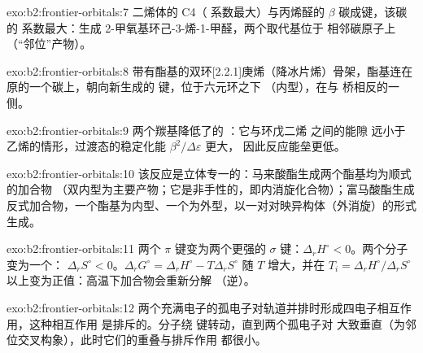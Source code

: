 \begin{solution}{exo:b2:frontier-orbitals:7}
二烯体的 C4（ 系数最大）与丙烯醛的 $\beta$ 碳成键，该碳的
 系数最大：生成 2-甲氧基环己-3-烯-1-甲醛，两个取代基位于
相邻碳原子上（“邻位”产物）。
\end{solution}

\begin{solution}{exo:b2:frontier-orbitals:8}
带有酯基的双环[2.2.1]庚烯（降冰片烯）骨架，酯基连在
原的一个碳上，朝向新生成的  键，位于六元环之下
（内型），在与  桥相反的一侧。
\end{solution}

\begin{solution}{exo:b2:frontier-orbitals:9}
两个羰基降低了的 ：它与环戊二烯  之间的能隙
远小于乙烯的情形，过渡态的稳定化能 $\beta^2/\Delta\varepsilon$ 更大，
因此反应能垒更低。
\end{solution}

\begin{solution}{exo:b2:frontier-orbitals:10}
该反应是立体专一的：马来酸酯生成两个酯基均为顺式的加合物
（双内型为主要产物；它是非手性的，即内消旋化合物）；富马酸酯生成
反式加合物，一个酯基为内型、一个为外型，以一对对映异构体（外消旋）的形式生成。
\end{solution}

\begin{solution}{exo:b2:frontier-orbitals:11}
两个 $\pi$ 键变为两个更强的 $\sigma$ 键：$\Delta_r H^\circ < 0$。两个分子变为一个：
$\Delta_r S^\circ < 0$。$\Delta_r G^\circ = \Delta_r H^\circ - T\Delta_r S^\circ$ 随 $T$ 增大，并在
$T_i = \Delta_r H^\circ/\Delta_r S^\circ$ 以上变为正值：高温下加合物会重新分解
（逆）。
\end{solution}

\begin{solution}{exo:b2:frontier-orbitals:12}
两个充满电子的孤电子对轨道并排时形成四电子相互作用，这种相互作用
是排斥的。分子绕  键转动，直到两个孤电子对
大致垂直（为邻位交叉构象），此时它们的重叠与排斥作用
都很小。
\end{solution}

